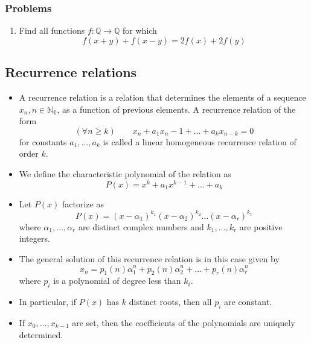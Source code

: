\documentclass{article}
\begin{document}
		\subsubsection*{Problems}
			\begin{enumerate}[resume]
				\item Find all functions $f: \mathbb{Q} \to \mathbb{Q}$ for which
				$$f(x+y) + f(x-y) = 2f(x) + 2f(y) $$
			\end{enumerate}

	\subsection{Recurrence relations}
		\begin{itemize}
			\item 
			A recurrence relation is a relation that determines the elements of a sequence $x_n, n \in \mathbb{N_0}$, as a function of previous elements. A recurrence relation of the form
			$$(\forall n \geq k) \hspace{2em} x_n + a_1x_n-1 + \hdots + a_kx_{n-k} = 0$$
			for constants $a_1, \hdots, a_k$ is called a linear homogeneous recurrence relation of order $k$.
			\item
			We define the characteristic polynomial of the relation as 
			$$P(x) = x^k + a_1x^{k-1} + \hdots + a_k$$
			\item
			Let $P(x)$	factorize as 
			$$P(x) = (x-\alpha_1)^{k_1}(x-\alpha_2)^{k_2} \hdots (x-\alpha_r)^{k_r}$$
			where $\alpha_1, \hdots , \alpha_r$ are distinct complex numbers and $k_1, \hdots, k_r$ are positive integers. 
			\item 
			The general solution of this recurrence relation is in this case given by
			$$x_n = p_1(n)\alpha_1^n + p_2(n)\alpha_2^n + \hdots + p_r(n)\alpha_r^n$$
			where $p_i$ is a polynomial of degree less than $k_i$.
			\item
			In particular, if $P(x)$ has $k$
			distinct roots, then all $p_i$ are constant.
			\item 
			If $x_0, \hdots, x_{k-1}$ are set, then the coefficients of the polynomials are uniquely determined.
		\end{itemize}
			
\end{document}
